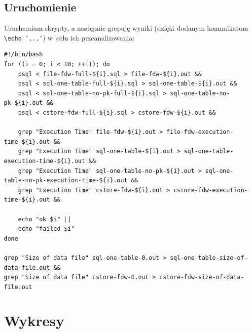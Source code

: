 \documentclass[a4paper,11pt]{article}
\begin{document}
\subsection{Uruchomienie}

Uruchamiam skrypty, a następnie grepuję wyniki (dzięki dodanym komunikatom \texttt{\textbackslash echo '...'}) w~celu ich przeanalizowania:
\begin{lstlisting}
#!/bin/bash
for ((i = 0; i < 10; ++i)); do
    psql < file-fdw-full-${i}.sql > file-fdw-${i}.out &&
    psql < sql-one-table-full-${i}.sql > sql-one-table-${i}.out &&
    psql < sql-one-table-no-pk-full-${i}.sql > sql-one-table-no-pk-${i}.out &&
    psql < cstore-fdw-full-${i}.sql > cstore-fdw-${i}.out &&

    grep "Execution Time" file-fdw-${i}.out > file-fdw-execution-time-${i}.out &&
    grep "Execution Time" sql-one-table-${i}.out > sql-one-table-execution-time-${i}.out &&
    grep "Execution Time" sql-one-table-no-pk-${i}.out > sql-one-table-no-pk-execution-time-${i}.out &&
    grep "Execution Time" cstore-fdw-${i}.out > cstore-fdw-execution-time-${i}.out &&

    echo "ok $i" ||
    echo "failed $i"
done

grep "Size of data file" sql-one-table-0.out > sql-one-table-size-of-data-file.out &&
grep "Size of data file" cstore-fdw-0.out > cstore-fdw-size-of-data-file.out
\end{lstlisting}


\section{Wykresy}
\end{document}
